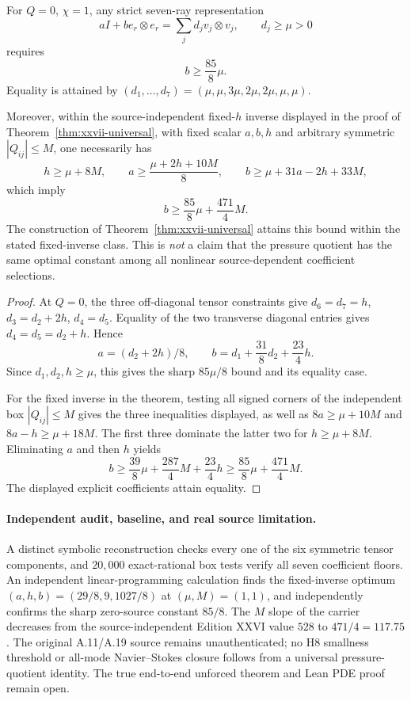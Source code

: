 \begin{proposition}
\label{prop:xxvii-sharp-floor}
For $Q=0$, $\chi=1$, any strict seven-ray representation
\[
aI+b e_r\otimes e_r=\sum_jd_jv_j\otimes v_j,\qquad
d_j\ge\mu>0
\]
requires
\begin{equation}\label{eq:xxvii-sharp-floor}
\boxed{\quad b\ge\frac{85}{8}\mu.\quad}
\end{equation}
Equality is attained by
$(d_1,\ldots,d_7)=(\mu,\mu,3\mu,2\mu,2\mu,\mu,\mu)$.

Moreover, within the source-independent fixed-$h$ inverse
displayed in the proof of Theorem~\ref{thm:xxvii-universal},
with fixed scalar $a,b,h$ and arbitrary symmetric
$|Q_{ij}|\le M$, one necessarily has
\[
h\ge\mu+8M,\qquad
a\ge\frac{\mu+2h+10M}{8},\qquad
b\ge\mu+31a-2h+33M,
\]
which imply
\begin{equation}\label{eq:xxvii-fixed-minimax}
\boxed{\quad
b\ge\frac{85}{8}\mu+\frac{471}{4}M.\quad}
\end{equation}
The construction of Theorem~\ref{thm:xxvii-universal}
attains this bound within the stated fixed-inverse class.
This is \emph{not} a claim that the pressure quotient has
the same optimal constant among all nonlinear
source-dependent coefficient selections.
\end{proposition}
\begin{proof}
At $Q=0$, the three off-diagonal tensor constraints give
$d_6=d_7=h$, $d_3=d_2+2h$, $d_4=d_5$.
Equality of the two transverse diagonal entries gives
$d_4=d_5=d_2+h$. Hence
\[
a=(d_2+2h)/8,\qquad
b=d_1+\frac{31}{8}d_2+\frac{23}{4}h.
\]
Since $d_1,d_2,h\ge\mu$, this gives the sharp $85\mu/8$
bound and its equality case.

For the fixed inverse in the theorem, testing all signed
corners of the independent box $|Q_{ij}|\le M$ gives
the three inequalities displayed, as well as
$8a\ge\mu+10M$ and $8a-h\ge\mu+18M$.
The first three dominate the latter two for
$h\ge\mu+8M$. Eliminating $a$ and then $h$ yields
\[
b\ge\frac{39}{8}\mu+\frac{287}{4}M
                 +\frac{23}{4}h
\ge\frac{85}{8}\mu+\frac{471}{4}M.
\]
The displayed explicit coefficients attain equality.
\end{proof}

\paragraph{Independent audit, baseline, and real source limitation.}
A distinct symbolic reconstruction checks every one of the
six symmetric tensor components, and $20{,}000$ exact-rational
box tests verify all seven coefficient floors.
An independent linear-programming calculation finds the
fixed-inverse optimum $(a,h,b)=(29/8,9,1027/8)$ at
$(\mu,M)=(1,1)$, and independently confirms the
sharp zero-source constant $85/8$.
The $M$ slope of the carrier decreases from the source-independent
Edition XXVI value $528$ to $471/4=117.75$.
The original A.11/A.19 source remains unauthenticated;
no H8 smallness threshold or all-mode Navier--Stokes
closure follows from a universal pressure-quotient identity.
The true end-to-end unforced theorem and Lean PDE proof remain open.
